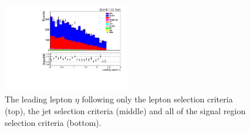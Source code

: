 \begin{figure}[h]
\includegraphics[width=0.49\textwidth]{figs/background-estimation/plots/unblinded/prompt_mumu_ttbarInc/lep1Eta_NPL_mumu_wMass_mumu.pdf}
\caption{
The leading lepton $\eta$ following only the lepton selection criteria (top), the jet selection criteria (middle) and all of the signal region selection criteria (bottom).
}
\label{fig:App_SR_lep1Eta}
\end{figure}


